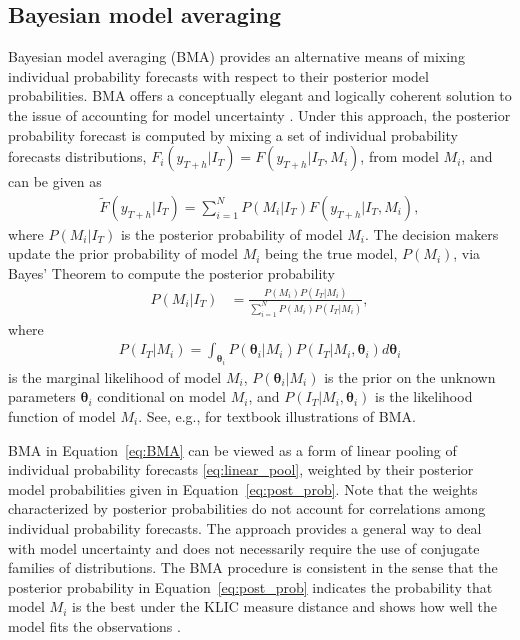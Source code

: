 \documentclass[11pt]{article}
\begin{document}
\subsection{Bayesian model averaging}
\label{sec:bma}

Bayesian model averaging (BMA) provides an alternative means of mixing individual probability forecasts with respect to their posterior model probabilities. BMA offers a conceptually elegant and logically coherent solution to the issue of accounting for model uncertainty \citep[see, e.g.,][]{Leamer1978-sp,Draper1995-cd,Raftery1997-ij,Garratt2003-kh}. Under this approach, the posterior probability forecast is computed by mixing a set of individual probability forecasts distributions, $F_{i}(y_{T+h}|I_{T})=F(y_{T+h}|I_{T},M_{i})$, from model $M_{i}$, and can be given as
\begin{align}
  \label{eq:BMA}
  \tilde{F}(y_{T+h}|I_{T}) = \sum_{i=1}^{N} P(M_{i}|I_{T})F(y_{T+h}|I_{T},M_{i}),
\end{align}
where $P(M_{i}|I_{T})$ is the posterior probability of model $M_{i}$. The decision makers update the prior probability of model $M_{i}$ being the true model, $P(M_{i})$, via Bayes' Theorem to compute the posterior probability
\begin{align}
  \label{eq:post_prob}
  P(M_{i}|I_{T}) & = \frac{P(M_{i})P(I_{T}|M_{i})}{\sum_{i=1}^{N} P(M_{i})P(I_{T}|M_{i})},
\end{align}
where
\begin{align}
  \label{eq:marginal_likelihood}
  P(I_{T}|M_{i}) = \int_{\bm{\theta}_{i}} P\left(\bm{\theta}_{i} | M_{i}\right) P\left(I_{T} | M_{i}, \bm{\theta}_{i}\right) d \bm{\theta}_{i}
\end{align}
is the marginal likelihood of model $M_{i}$, $P\left(\bm{\theta}_{i} | M_{i}\right)$ is the prior on the unknown parameters $\bm{\theta}_{i}$ conditional on model $M_{i}$, and $P\left(I_{T} | M_{i}, \bm{\theta}_{i}\right)$ is the likelihood function of model $M_{i}$. See, e.g., \citet{Koop-2003bayesian} for textbook illustrations of BMA.

BMA in Equation~\eqref{eq:BMA} can be viewed as a form of linear pooling of individual probability forecasts \eqref{eq:linear_pool}, weighted by their posterior model probabilities given in Equation~\eqref{eq:post_prob}. Note that the weights characterized by posterior probabilities do not account for correlations among individual probability forecasts. The approach provides a general way to deal with model uncertainty and does not necessarily require the use of conjugate families of distributions. The BMA procedure is consistent in the sense that the posterior probability in Equation~\eqref{eq:post_prob} indicates the probability that model $M_{i}$ is the best under the KLIC measure distance and shows how well the model fits the observations \citep{Fernandez-Villaverde2004-pz,Raftery2005-vu,Wright2008-bs}.
\end{document}
